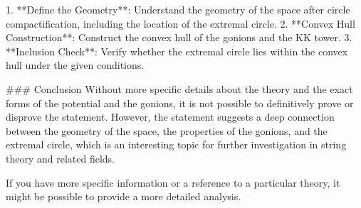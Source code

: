 1. **Define the Geometry**: Understand the geometry of the space after circle compactification, including the location of the extremal circle.
2. **Convex Hull Construction**: Construct the convex hull of the gonions and the KK tower.
3. **Inclusion Check**: Verify whether the extremal circle lies within the convex hull under the given conditions.

### Conclusion
Without more specific details about the theory and the exact forms of the potential and the gonions, it is not possible to definitively prove or disprove the statement. However, the statement suggests a deep connection between the geometry of the space, the properties of the gonions, and the extremal circle, which is an interesting topic for further investigation in string theory and related fields.

If you have more specific information or a reference to a particular theory, it might be possible to provide a more detailed analysis.